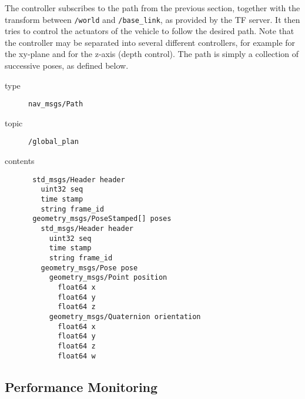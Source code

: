 \documentclass[9pt,technote]{IEEEtran} %
\begin{document}
The controller subscribes to the path from the previous
section, together with the transform between \texttt{/world}
and \texttt{/base\_link}, as provided by the TF server.
It then tries to control the actuators of the vehicle
to follow the desired path. Note that the controller may be
separated into several different controllers, for example for
the xy-plane and for the z-axis (depth control).
The path is simply a collection of successive poses, as defined below.
\begin{description}
\item[type] \texttt{nav\_msgs/Path}
\item[topic] \texttt{/global\_plan}
\item[contents] \begin{scriptsize}
\begin{verbatim}
 std_msgs/Header header
   uint32 seq
   time stamp
   string frame_id
 geometry_msgs/PoseStamped[] poses
   std_msgs/Header header
     uint32 seq
     time stamp
     string frame_id
   geometry_msgs/Pose pose
     geometry_msgs/Point position
       float64 x
       float64 y
       float64 z
     geometry_msgs/Quaternion orientation
       float64 x
       float64 y
       float64 z
       float64 w
\end{verbatim}
\end{scriptsize}
\end{description}

\subsection{Performance Monitoring}
\label{monitor}
\end{document}
